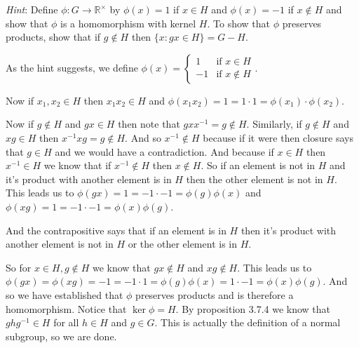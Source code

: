\documentclass[letterpaper]{article}
\begin{document}
\begin{enumerate}
\begin{enumerate}
    {\em Hint}: Define $\phi:G\to\mathbb{R}^\times$ by $\phi(x)=1$ if $x\in H$ and $\phi(x)=-1$ if $x\not\in H$ and show that $\phi$ is a homomorphism with kernel $H$. To show that $\phi$ preserves products, show that if $g\not\in H$ then $\{x:gx\in H\}=G-H$.

    As the hint suggests, we define $\phi(x)=\begin{cases}1&\text{if }x\in H\\-1&\text{if }x\not\in H\end{cases}$.

    Now if $x_1,x_2\in H$ then $x_1x_2\in H$ and $\phi(x_1x_2)=1=1\cdot1=\phi(x_1)\cdot\phi(x_2)$.
    
    Now if $g\not\in H$ and $gx\in H$ then note that $gxx^{-1}=g\not\in H$.
    Similarly, if $g\not\in H$ and $xg\in H$ then $x^{-1}xg=g\not\in H$.
    And so $x^{-1}\not\in H$ because if it were then closure says that $g\in H$ and we would have a contradiction.
    And because if $x\in H$ then $x^{-1}\in H$ we know that if $x^{-1}\not\in H$ then $x\not\in H$.
    So if an element is not in $H$ and it's product with another element is in $H$ then the other element is not in $H$.
    This leads us to $\phi(gx)=1=-1\cdot-1=\phi(g)\phi(x)$ and $\phi(xg)=1=-1\cdot-1=\phi(x)\phi(g)$.

    And the contrapositive says that if an element is in $H$ then it's product with another element is not in $H$ or the other element is in $H$.

    So for $x\in H, g\not\in H$ we know that $gx\not\in H$ and $xg\not\in H$.
    This leads us to $\phi(gx)=\phi(xg)=-1=-1\cdot1=\phi(g)\phi(x)=1\cdot-1=\phi(x)\phi(g)$.
    And so we have established that $\phi$ preserves products and is therefore a homomorphism.
    Notice that $\ker\phi=H$.
    By proposition 3.7.4 we know that $ghg^{-1}\in H$ for all $h\in H$ and $g\in G$.
    This is actually the definition of a normal subgroup, so we are done.

  \end{enumerate}
\end{enumerate}
\end{document}
